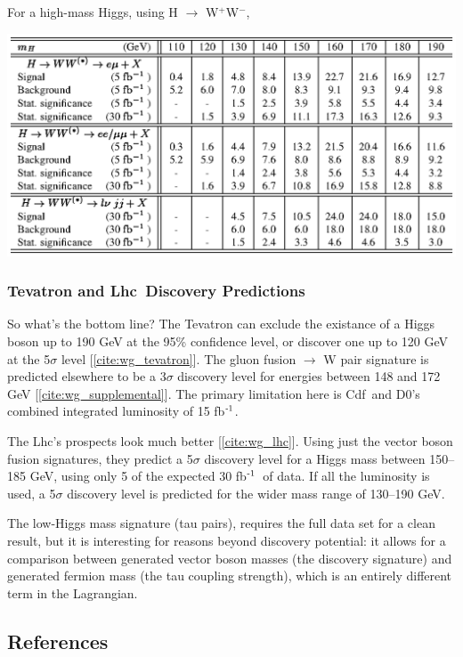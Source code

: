 \documentclass[12pt]{article}
\def\cdf{{\sc Cdf}}
\def\dzero{{\sc D0}}
\def\lhc{{\sc Lhc}}
\def\inv{$^{\mbox{\scriptsize -1}}$}
\begin{document}
For a high-mass Higgs, using H $\to$ W$^+$W$^-$,
\begin{center} \includegraphics{table_lhc_high_mass.eps} \end{center}

\subsubsection{Tevatron and \lhc\ Discovery Predictions}

So what's the bottom line? The Tevatron can exclude the existance of a
Higgs boson up to 190 GeV at the 95\% confidence level, or discover
one up to 120 GeV at the 5$\sigma$ level [\ref{cite:wg_tevatron}]. The
gluon fusion $\to$ W pair signature is predicted elsewhere to be a
3$\sigma$ discovery level for energies between 148 and 172 GeV
[\ref{cite:wg_supplemental}]. The primary limitation here is \cdf\ and
\dzero's combined integrated luminosity of 15 fb\inv.

The \lhc's prospects look much better [\ref{cite:wg_lhc}]. Using just
the vector boson fusion signatures, they predict a 5$\sigma$ discovery
level for a Higgs mass between 150--185 GeV, using only 5 of the
expected 30 fb\inv\ of data. If all the luminosity is used, a
5$\sigma$ discovery level is predicted for the wider mass range of
130--190 GeV.

The low-Higgs mass signature (tau pairs), requires the full data set
for a clean result, but it is interesting for reasons beyond discovery
potential: it allows for a comparison between generated vector boson
masses (the discovery signature) and generated fermion mass (the tau
coupling strength), which is an entirely different term in the
Lagrangian.

\subsection{References}
\end{document}

